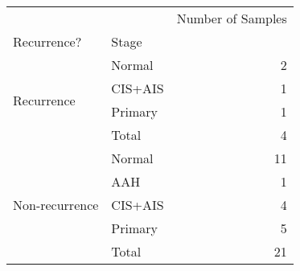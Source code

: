 \begin{tabular}{l|lr}
\toprule
               &       & Number of Samples \\
Recurrence? & Stage &                   \\
\midrule
\multirow{4}{*}{Recurrence} & Normal &                 2 \\
               & CIS+AIS &                 1 \\
               & Primary &                 1 \\
               & Total &                 4 \\
\cline{1-3}
\multirow{5}{*}{Non-recurrence} & Normal &                11 \\
               & AAH &                 1 \\
               & CIS+AIS &                 4 \\
               & Primary &                 5 \\
               & Total &                21 \\
\bottomrule
\end{tabular}
